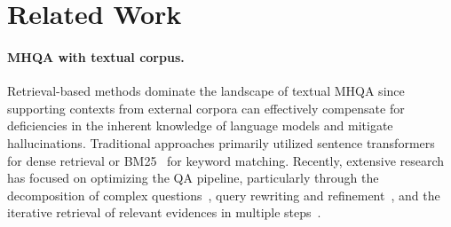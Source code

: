 \section{Related Work}
\paragraph{MHQA with textual corpus.}
Retrieval-based methods dominate the landscape of textual MHQA since supporting contexts from external corpora can effectively compensate for deficiencies in the inherent knowledge of language models and mitigate hallucinations. Traditional approaches primarily utilized sentence transformers~\cite{bgem3} for dense retrieval or BM25~\cite{BM25} for keyword matching. Recently, extensive research has focused on optimizing the QA pipeline, particularly through the decomposition of complex questions~\cite{IM-RAG,ReAct}, query rewriting and refinement~\cite{RQ-RAG,RaFe}, and the iterative retrieval of relevant evidences in multiple steps~\cite{SelfRAG,ReSP,Iter-RetRAG,IRCoT}. 

